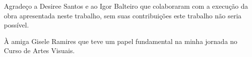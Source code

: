 \begin{agradecimento}

Agradeço a Desiree Santos e ao Igor Balteiro que colaboraram com a execução da obra apresentada neste trabalho, sem suas contribuições este trabalho não seria possível.

À amiga Gisele Ramires que teve um papel fundamental na minha jornada no Curso de Artes Visuais.

\end{agradecimento}